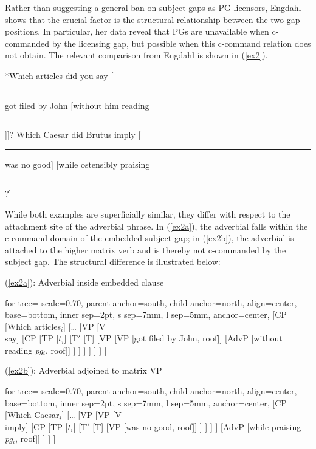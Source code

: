 \documentclass[12pt]{article}
\newcommand{\gap}{\rule{1.25em}{.5pt}} %
\newcommand{\TwoTreeCols}[2]{%
  \noindent\parbox[t]{0.47\linewidth}{#1}%
  \hspace{1.2em}%
  \parbox[t]{0.47\linewidth}{#2}\par
}
\begin{document}
Rather than suggesting a general ban on subject gaps as PG licensors, Engdahl shows that the crucial factor is the structural relationship between the two gap positions. In particular, her data reveal that PGs are unavailable when c-commanded by the licensing gap, but possible when this c-command relation does not obtain. The relevant comparison from Engdahl is shown in (\ref{ex2}). 

\pex \label{ex2}
\a \label{ex2a} *Which articles did you say [\gap{} got filed by John [without him reading \gap{}]]?
\a \label{ex2b} Which Caesar did Brutus imply [\gap{} was no good] [while ostensibly praising \gap{}?]
\xe

While both examples are superficially similar, they differ with respect to the attachment site of the adverbial phrase. In (\ref{ex2a}), the adverbial falls within the c-command domain of the embedded subject gap; in (\ref{ex2b}), the adverbial is attached to the higher matrix verb and is thereby not c-commanded by the subject gap. The structural difference is illustrated below:

\vspace{\baselineskip}

\TwoTreeCols
{%
  (\ref{ex2a}): Adverbial inside embedded clause%

  \vspace{0.6\baselineskip}
  \centering
  \begin{forest}
  for tree={
    scale=0.70,
    parent anchor=south,
    child anchor=north,
    align=center,
    base=bottom,
    inner sep=2pt,
    s sep=7mm,
    l sep=5mm,
    anchor=center,
  }
  [CP
    [{Which articles$_i$}]
    [\ldots
      [VP
        [V\\say]
        [CP
          [TP
            [$t_i$]
            [T$'$
              [T]
              [VP
                [VP [{got filed by John}, roof]]
                [AdvP [{without reading \textit{pg}$_i$}, roof]]
              ]
            ]
          ]
        ]
      ]
    ]
  ]
  \end{forest}
}
{%
  (\ref{ex2b}): Adverbial adjoined to matrix VP%

  \vspace{0.6\baselineskip}
  \centering
  \begin{forest}
  for tree={
    scale=0.70,
    parent anchor=south,
    child anchor=north,
    align=center,
    base=bottom,
    inner sep=2pt,
    s sep=7mm,
    l sep=5mm,
    anchor=center,
  }
  [CP
    [{Which Caesar$_i$}]
    [\ldots
      [VP
        [VP
          [V\\imply]
          [CP
            [TP
              [$t_i$]
              [T$'$
                [T]
                [VP [{was no good}, roof]]
              ]
            ]
          ]
        ]
        [AdvP [{while praising \textit{pg}$_i$}, roof]]
      ]
    ]
  ]
  \end{forest}
}
\end{document}

